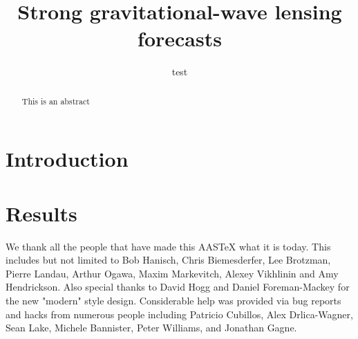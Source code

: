 \documentclass[linenumbers]{aastex631}
\begin{document}
\title{Strong gravitational-wave lensing forecasts}


\author[0000-0002-0786-7307]{test}


\begin{abstract}
This is an abstract
\end{abstract}



\section{Introduction} \label{sec:intro}


\section{Results}






\begin{acknowledgments}
We thank all the people that have made this AASTeX what it is today.  This
includes but not limited to Bob Hanisch, Chris Biemesderfer, Lee Brotzman,
Pierre Landau, Arthur Ogawa, Maxim Markevitch, Alexey Vikhlinin and Amy
Hendrickson. Also special thanks to David Hogg and Daniel Foreman-Mackey
for the new "modern" style design. Considerable help was provided via bug
reports and hacks from numerous people including Patricio Cubillos, Alex
Drlica-Wagner, Sean Lake, Michele Bannister, Peter Williams, and Jonathan
Gagne.
\end{acknowledgments}


{}

\end{document}
